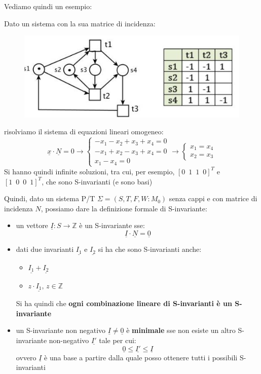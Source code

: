 \documentclass[a4paper,12pt, oneside]{book}
\begin{document}
\begin{definizione}
  \newpage
  Vediamo quindi un esempio:
  \begin{esempio}
    Dato un sistema con la sua matrice di incidenza:
    \begin{figure}[H]
      \centering
      \includegraphics[scale = 0.6]{img/si2.jpg} 
    \end{figure}
    risolviamo il sistema di equazioni lineari omogeneo:
    \[
      \underline{x}\cdot \underline{N}=0\to\begin{cases}
        -x_1-x_2+x_3+x_4=0\\
        -x_1+x_2-x_3+x_4=0\\
        x_1-x_4=0
      \end{cases}\to
      \begin{cases}
        x_1=x_4\\
        x_2=x_3
      \end{cases}
    \]
    Si hanno quindi infinite soluzioni, tra cui, per esempio,
    $[0\,\,\,1\,\,\,1\,\,\,0]^T$ e $[1\,\,\,0\,\,\,0\,\,\,1]^T$, che sono
    S-invarianti (e sono basi)
  \end{esempio}
  Quindi, dato un sistema P/T $\Sigma=(S,T,F,W:M_0)$ senza cappi e con matrice
  di incidenza $N$, possiamo dare la definizione formale di S-invariante:
  \begin{itemize}
    \item un vettore $\underline{I}:S\to \mathbb{Z}$ è un S-invariante sse:
    \[\underline{I}\cdot \underline{N}=\underline{0}\]
    \item dati due invarianti $\underline{I_1}$ e $\underline{I_2}$ si ha che
    sono S-invarianti anche:
    \begin{itemize}
      \item $\underline{I_1}+\underline{I_2}$
      \item $z\cdot \underline{I_1},\,z\in \mathbb{Z}$
    \end{itemize}
    Si ha quindi che \textbf{ogni combinazione lineare di S-invarianti è un
      S-invariante}  
    \item un S-invariante non negativo $\underline{I}\neq \underline{0}$ è
    \textbf{minimale} sse non esiste un altro S-invariante non-negativo
    $\underline{I'}$ tale per cui:
    \[\underline{0}\leq \underline{I'}\leq \underline{I}\]
    ovvero $\underline{I}$ è una base a partire dalla quale posso ottenere tutti
    i possibili S-invarianti
  \end{itemize}
\end{definizione}
\end{document}
